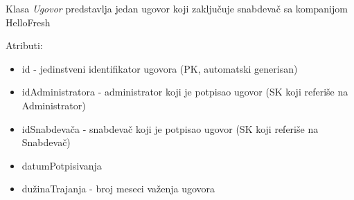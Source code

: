 Klasa \textit{Ugovor} predstavlja jedan ugovor koji zaključuje snabdevač sa kompanijom HelloFresh

Atributi:
\begin{itemize}
    \item id - jedinstveni identifikator ugovora (PK, automatski generisan)
    \item idAdministratora - administrator koji je potpisao ugovor (SK koji referiše na Administrator)
    \item idSnabdevača - snabdevač koji je potpisao ugovor (SK koji referiše na Snabdevač)
    \item datumPotpisivanja
    \item dužinaTrajanja - broj meseci važenja ugovora
\end{itemize}
